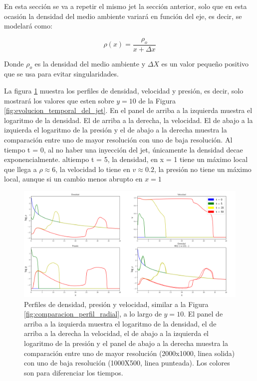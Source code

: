 \documentclass[12pt,a4paper]{book}
\begin{document}
{\color {red} En esta sección se va a repetir el mismo jet la sección anterior, solo que en esta ocasión la densidad
del medio ambiente variará en función del eje, es decir, se modelará como:

\begin{equation}
  \rho(x) = \frac{\rho_o}{x+\Delta x} 
\end{equation}

Donde $\rho_o$ es la densidad del medio ambiente y $\Delta X$ es un valor pequeño positivo que se usa para evitar singularidades.



La figura \ref{fig:Decaimiento_lineal_densidad_jet} muestra los perfiles de densidad, velocidad y presión, es decir, solo mostrará 
los valores que esten sobre $y = 10$ de la Figura \ref{fig:evolucion_temporal_del_jet}. En el panel de arriba 
a la izquierda  muestra el logaritmo de la densidad. El de arriba a la derecha, la velocidad. El de abajo a la izquierda el 
logaritmo de la presión y el de abajo a la derecha muestra la comparación entre
uno de mayor resolución con uno de baja resolución. Al tiempo t = 0, al no haber una inyección del jet, únicamente la densidad decae
exponencialmente. altiempo t = 5, la densidad, en x = 1 tiene un máximo local que llega a $\rho \approx 6$, la velocidad lo tiene en 
$v \approx 0.2$, la presión no tiene un máximo local, aunque si un cambio menos abrupto en $x = 1$ 


\begin{figure}
  \centering
  \includegraphics[width = 1.0\textwidth]{./Figuras/jet/perfiles/perfiles_lineales.png}
  \caption{{\color{red} Perfiles de densidad, presión y velocidad, similar a la Figura \ref{fig:comparacion_perfil_radial},
  a lo largo de $y = 10$. El panel de arriba a la izquierda muestra el logaritmo de la densidad, el de arriba a la derecha la
  velocidad, el de abajo a la izquierda el logaritmo de la presión y el panel de abajo a la derecha muestra la comparación entre
  uno de mayor resolución (2000x1000, linea solida) con uno de baja resolución (1000X500,
  linea punteada). Los colores son para diferenciar los tiempos.}}\label{fig:Decaimiento_lineal_densidad_jet}
\end{figure}



}
\end{document}
